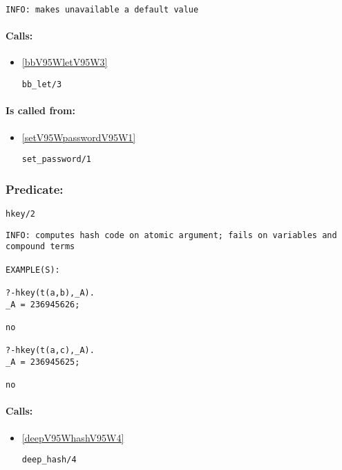 {\small \begin{verbatim}
INFO: makes unavailable a default value

\end{verbatim}}
\paragraph{Calls:} 
\begin{itemize}
\item \ref{bbV95WletV95W3} 
\begin{verbatim}
bb_let/3
\end{verbatim}

\end{itemize}
\paragraph{Is called from:} 
\begin{itemize}
\item \ref{setV95WpasswordV95W1} 
\begin{verbatim}
set_password/1
\end{verbatim}

\end{itemize}

\subsubsection{Predicate:} \label{hkeyV95W2}

\begin{verbatim}
hkey/2
\end{verbatim}

{\small \begin{verbatim}
INFO: computes hash code on atomic argument; fails on variables and compound terms

EXAMPLE(S):

?-hkey(t(a,b),_A).
_A = 236945626;

no

?-hkey(t(a,c),_A).
_A = 236945625;

no

\end{verbatim}}
\paragraph{Calls:} 
\begin{itemize}
\item \ref{deepV95WhashV95W4} 
\begin{verbatim}
deep_hash/4
\end{verbatim}

\end{itemize}

